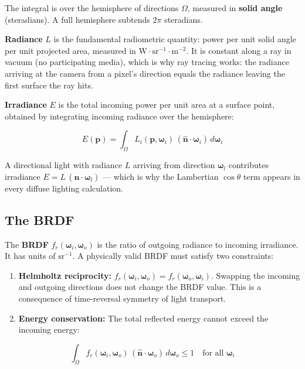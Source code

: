\documentclass[
  11pt,
  letterpaper,
  DIV=11,
  numbers=noendperiod,
  twoside,
  open=right]{scrreprt}
\begin{document}
The integral is over the hemisphere of directions \(\Omega\), measured
in \textbf{solid angle} (steradians). A full hemisphere subtends
\(2\pi\) steradians.

\textbf{Radiance} \(L\) is the fundamental radiometric quantity: power
per unit solid angle per unit projected area, measured in
\(\text{W} \cdot \text{sr}^{-1} \cdot \text{m}^{-2}\). It is constant
along a ray in vacuum (no participating media), which is why ray tracing
works: the radiance arriving at the camera from a pixel's direction
equals the radiance leaving the first surface the ray hits.

\textbf{Irradiance} \(E\) is the total incoming power per unit area at a
surface point, obtained by integrating incoming radiance over the
hemisphere:

\[
E(\mathbf{p}) = \int_{\Omega} L_i(\mathbf{p}, \boldsymbol{\omega}_i) \, (\hat{\mathbf{n}} \cdot \boldsymbol{\omega}_i) \, d\boldsymbol{\omega}_i
\]

A directional light with radiance \(L\) arriving from direction
\(\boldsymbol{\omega}_l\) contributes irradiance
\(E = L \, (\hat{\mathbf{n}} \cdot \boldsymbol{\omega}_l)\) --- which is
why the Lambertian \(\cos\theta\) term appears in every diffuse lighting
calculation.

\subsection{The BRDF}\label{the-brdf}

The \textbf{BRDF} \(f_r(\boldsymbol{\omega}_i, \boldsymbol{\omega}_o)\)
is the ratio of outgoing radiance to incoming irradiance. It has units
of \(\text{sr}^{-1}\). A physically valid BRDF must satisfy two
constraints:

\begin{enumerate}
\def\labelenumi{\arabic{enumi}.}
\item
  \textbf{Helmholtz reciprocity:}
  \(f_r(\boldsymbol{\omega}_i, \boldsymbol{\omega}_o) = f_r(\boldsymbol{\omega}_o, \boldsymbol{\omega}_i)\).
  Swapping the incoming and outgoing directions does not change the BRDF
  value. This is a consequence of time-reversal symmetry of light
  transport.
\item
  \textbf{Energy conservation:} The total reflected energy cannot exceed
  the incoming energy:
\end{enumerate}

\[
\int_{\Omega} f_r(\boldsymbol{\omega}_i, \boldsymbol{\omega}_o) \, (\hat{\mathbf{n}} \cdot \boldsymbol{\omega}_o) \, d\boldsymbol{\omega}_o \leq 1 \quad \text{for all } \boldsymbol{\omega}_i
\]
\end{document}
